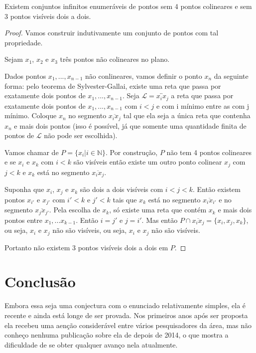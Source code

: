 \begin{teorema}
    Existem conjuntos infinitos enumeráveis de pontos sem 4 pontos colineares e sem 3 pontos visíveis dois a dois.
\end{teorema}
\begin{proof}
    Vamos construir indutivamente um conjunto de pontos com tal propriedade.

    Sejam $x_1$, $x_2$ e $x_3$ três pontos não colineares no plano.

    Dados pontos $x_1,...,x_{n-1}$ não conlineares, vamos definir o ponto $x_n$ da seguinte forma: pelo teorema de Sylvester-Gallai, existe uma reta que passa por exatamente dois pontos de $x_1,...,x_{n-1}$. Seja $\mathcal L=\overleftrightarrow{x_ix_j}$ a reta que passa por exatamente dois pontos de $x_1,...,x_{n-1}$ com $i<j$ e com i mínimo entre as com j mínimo. Coloque $x_n$ no segmento $\overline{x_ix_j}$ tal que ela seja a única reta que contenha $x_n$ e mais dois pontos (isso é possível, já que somente uma quantidade finita de pontos de $\mathcal L$ não pode ser escolhida).

    Vamos chamar de $P = \{x_i|i\in \mathbb N\}$. Por construção, $P$ não tem 4 pontos colineares e se $x_i$ e $x_k$ com $i<k$ são visíveis então existe um outro ponto colinear $x_j$ com $j<k$ e $x_k$ está no segmento $\overline{x_ix_j}$.

    Suponha que $x_i$, $x_j$ e $x_k$ são dois a dois visíveis com $i<j<k$. Então existem pontos $x_{i'}$ e $x_{j'}$ com $i'<k$ e $j'<k$ tais que $x_k$ está no segmento $\overline{x_ix_{i'}}$ e no segmento $\overline{x_jx_{j'}}$. Pela escolha de $x_k$, só existe uma reta que contém $x_k$ e mais dois pontos entre $x_1,...x_{k-1}$. Então $i=j'$ e $j=i'$. Mas então $P\cap\overline{x_ix_j}=\{x_i,x_j,x_k\}$, ou seja, $x_i$ e $x_j$ não são visíveis, ou seja, $x_i$ e $x_j$ não são visíveis.

    Portanto não existem 3 pontos visíveis dois a dois em $P$.

\end{proof}

\section{Conclusão}
Embora essa seja uma conjectura com o enunciado relativamente simples, ela é recente e ainda está longe de ser provada. Nos primeiros anos após ser proposta ela recebeu uma aenção considerável entre vários pesquisadores da área, mas não conheço nenhuma publicação sobre ela de depois de 2014, o que mostra a dificuldade de se obter qualquer avanço nela atualmente.


